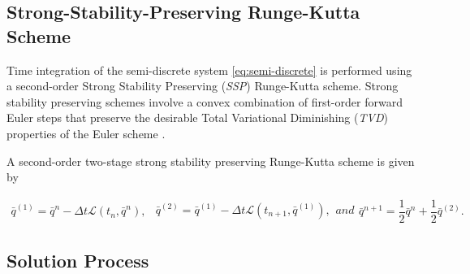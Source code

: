\documentclass[SingleSpace,12pt]{Serre_ASCE}
\begin{document}
\subsection{Strong-Stability-Preserving Runge-Kutta Scheme} %

Time integration of the semi-discrete system \eqref{eq:semi-discrete} is performed using a second-order Strong Stability Preserving (\emph{SSP}) Runge-Kutta scheme. Strong stability preserving schemes involve a convex combination of first-order forward Euler steps that preserve the desirable Total Variational Diminishing (\emph{TVD}) properties of the Euler scheme \cite{Shu-Osher-1988-439,Gottlieb-etal-2009-251}.

A second-order two-stage strong stability preserving Runge-Kutta scheme is given by \cite{Shu-Osher-1988-439,MacDonald-etal-2008-89}
\begin{linenomath*}
\begin{subequations}
\begin{gather}
\bar{q}^{(1)} = \bar{q}^n - \Delta t \mathcal{L}(t_n,\bar{q}^n),
\end{gather}
\begin{gather}
\bar{q}^{(2)} = \bar{q}^{(1)} - \Delta t \mathcal{L}(t_{n+1},\bar{q}^{(1)}),
\end{gather}
and
\begin{gather}
\bar{q}^{n+1} = \dfrac{1}{2}\bar{q}^n + \dfrac{1}{2}\bar{q}^{(2)}.
\end{gather}
\label{eq:RK_TVD_shu_Osher0}
\end{subequations}
\end{linenomath*}

\subsection{Solution Process} %
\end{document}
